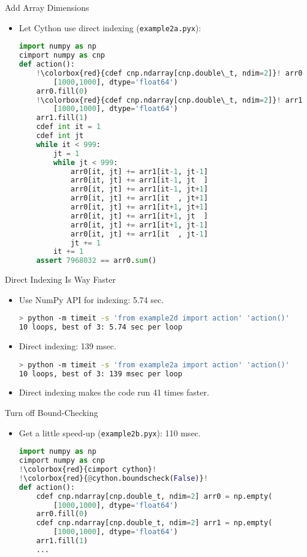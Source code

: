 \documentclass[dvips,xcolor=pst,14pt]{beamer}
\begin{document}
\begin{frame}[fragile]{
%
Add Array Dimensions
%
}
\begin{itemize}
\item Let Cython use direct indexing ({\color{red}\verb+example2a.pyx+}):
\begin{lstlisting}[basicstyle=\tiny\ttfamily,language=Python,escapechar=!]
import numpy as np
cimport numpy as cnp
def action():
    !\colorbox{red}{cdef cnp.ndarray[cnp.double\_t, ndim=2]}! arr0 = np.empty(
        [1000,1000], dtype='float64')
    arr0.fill(0)
    !\colorbox{red}{cdef cnp.ndarray[cnp.double\_t, ndim=2]}! arr1 = np.empty(
        [1000,1000], dtype='float64')
    arr1.fill(1)
    cdef int it = 1
    cdef int jt
    while it < 999:
        jt = 1
        while jt < 999:
            arr0[it, jt] += arr1[it-1, jt-1]
            arr0[it, jt] += arr1[it-1, jt  ]
            arr0[it, jt] += arr1[it-1, jt+1]
            arr0[it, jt] += arr1[it  , jt+1]
            arr0[it, jt] += arr1[it+1, jt+1]
            arr0[it, jt] += arr1[it+1, jt  ]
            arr0[it, jt] += arr1[it+1, jt-1]
            arr0[it, jt] += arr1[it  , jt-1]
            jt += 1
        it += 1
    assert 7968032 == arr0.sum()
\end{lstlisting}
\end{itemize}
\end{frame}

\begin{frame}[fragile]{
%
Direct Indexing Is Way Faster
%
}
\begin{itemize}
\item Use NumPy API for indexing: 5.74 sec.
\begin{lstlisting}[language=bash]
> python -m timeit -s 'from example2d import action' 'action()'
10 loops, best of 3: 5.74 sec per loop
\end{lstlisting}
\item Direct indexing: 139 msec. 
\begin{lstlisting}[language=bash]
> python -m timeit -s 'from example2a import action' 'action()'
10 loops, best of 3: 139 msec per loop
\end{lstlisting}
\item Direct indexing makes the code run \alert{41} times faster.
\end{itemize}
\end{frame}

\begin{frame}[fragile]{
%
Turn off Bound-Checking
%
}
\begin{itemize}
\item Get a little speed-up ({\color{red}\verb+example2b.pyx+}): 110 msec.
\begin{lstlisting}[language=Python,escapechar=!]
import numpy as np
cimport numpy as cnp
!\colorbox{red}{cimport cython}!
!\colorbox{red}{@cython.boundscheck(False)}!
def action():
    cdef cnp.ndarray[cnp.double_t, ndim=2] arr0 = np.empty(
        [1000,1000], dtype='float64')
    arr0.fill(0)
    cdef cnp.ndarray[cnp.double_t, ndim=2] arr1 = np.empty(
        [1000,1000], dtype='float64')
    arr1.fill(1)
    ...
\end{lstlisting}
\end{itemize}
\end{frame}
\end{document}
